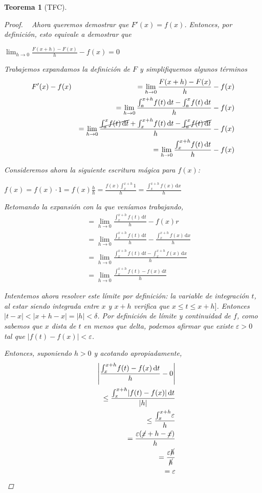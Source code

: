 \documentclass[]{article}
\newtheorem{teo}{Teorema}
\def\e{\varepsilon}
\newcommand{\integral}[4]{\int_{#1}^{#2} \! #3 \, \mathrm{d}#4}
\newcommand{\intres}[3]{\int_{#1}^{#2} \! #3}
\begin{document}
\begin{teo}[TFC]
\begin{proof}
		~\newline
		Ahora queremos demostrar que $F'(x) = f(x)$. Entonces, por definición, esto equivale a demostrar que
		\begin{center}
			$\displaystyle \lim_{h\to 0}\frac{F(x+h)-F(x)}{h}-f(x) = 0$
		\end{center}
		
		Trabajemos expandamos la definición de $F$ y simplifiquemos algunos términos
		\begin{eqnarray*}
			& F'(x)-f(x) & = \lim_{h\to 0}\frac{F(x+h)-F(x)}{h}-f(x) \\
			& & =\lim_{h\to 0}\frac{\integral{a}{x+h}{f(t)}{t} - \integral{a}{x}{f(t)}{t}}{h}-f(x) \\
			& & =\lim_{h\to 0}\frac{\cancel{\integral{a}{x}{f(t)}{t}} + \integral{x}{x+h}{f(t)}{t} - \cancel{\integral{a}{x}{f(t)}{t}}}{h}-f(x) \\
			& & =\lim_{h\to 0}\frac{\integral{x}{x+h}{f(t)}{t}}{h}-f(x) 
		\end{eqnarray*}
	
		Consideremos ahora la siguiente escritura mágica para $f(x)$:
		\begin{center}
			$\displaystyle f(x) = f(x)\cdot 1 = f(x)\frac{h}{h} = \frac{f(x)\intres{x}{x+h}{1}}{h} = \frac{\integral{x}{x+h}{f(x)}{x}}{h}$
		\end{center}
	
		Retomando la expansión con la que veníamos trabajando,
		\begin{eqnarray*}
			& & = \lim_{h\to 0}\frac{\integral{x}{x+h}{f(t)}{t}}{h}-f(x) r\\
			& & =\lim_{h\to 0}\frac{\integral{x}{x+h}{f(t)}{t}}{h}-\frac{\integral{x}{x+h}{f(x)}{x}}{h} \\
			& & =\lim_{h\to 0}\frac{\integral{x}{x+h}{f(t)}{t}-\integral{x}{x+h}{f(x)}{x}}{h} \\
			& & =\lim_{h\to 0}\frac{\integral{x}{x+h}{f(t)-f(x)}{t}}{h}
		\end{eqnarray*}
	
		Intentemos ahora resolver este límite por definición: la variable de integración $t$, al estar siendo integrada entre $x$ y $x+h$ verifica que $x\leq t\leq x+h]$. Entonces $|t-x| < |x+h-x| = |h| < \delta$. Por definición de límite y continuidad de $f$, como sabemos que $x$ dista de $t$ en menos que delta, podemos afirmar que existe $\e>0$ tal que $|f(t)-f(x)|<\e$.
		
		Entonces, suponiendo $h>0$ y acotando apropiadamente,
		\begin{eqnarray}
			& & \left|\frac{\integral{x}{x+h}{f(t)-f(x)}{t}}{h} - 0 \right| \\
			& & \leq \frac{\integral{x}{x+h}{|f(t)-f(x)|}{t}}{|h|} \\
			& & \leq \frac{\intres{x}{x+h}{\e}}{h} \\
			& & = \frac{\e(\cancel{x}+h-\cancel{x})}{h} \\
			& & = \frac{\e\cancel{h}}{\cancel{h}} \\
			& & =\e
		\end{eqnarray}
		

\end{proof}
\end{teo}
\end{document}
